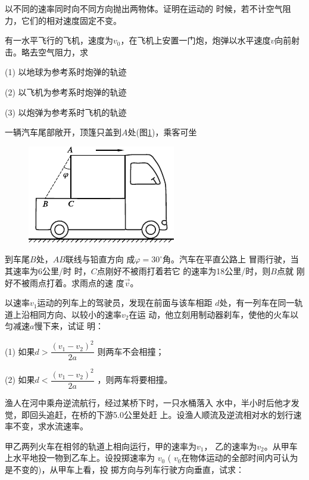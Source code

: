 \begin{exercises}

\exercise 以不同的速率同时向不同方向抛出两物体。证明在运动的
时候，若不计空气阻力，它们的相对速度固定不变。

\exercise 有一水平飞行的飞机，速度为$ v _ { 0 }$，在飞机上安置一门炮，炮弹以水平速度$ v $向前射击。略去空气阻力，求

(1) 以地球为参考系时炮弹的轨迹

(2) 以飞机为参考系时炮弹的轨迹

(3) 以炮弹为参考系时飞机的轨迹

\exercise 一辆汽车尾部敞开，顶篷只盖到$A$处(图\ref{fig:02.17})，乘客可坐
\begin{figure}
  \includegraphics{figure/fig02.17}
  \caption{}
  \label{fig:02.17}
\end{figure}
到车尾$B$处，$AB$联线与铅直方向
成$ \varphi = 3 0 ^ { \circ } $角。汽车在平直公路上
冒雨行驶，当其速率为6公里/时
时，$C$点刚好不被雨打着若它
的速率为18公里/时，则$B$点就
刚好不被雨点打着。求雨点的速
度$ \vec{v} $。

\exercise 以速率$ v _ { 1 } $运动的列车上的驾驶员，发现在前面与该车相距
$d$处，有一列车在同一轨道上沿相同方向、以较小的速率$v_2$在运
动，他立刻用制动器刹车，使他的火车以匀减速$a$慢下来，试证
明：

(1) 如果$d > \dfrac { \left( v _ { 1 } - v _ { 2 } \right) ^ { 2 } } { 2 a }$
则两车不会相撞；

(2) 如果$d < \dfrac { \left( v _ { 1 } - v _ { 2 } \right) ^ { 2 } } { 2 a }$
，则两车将要相撞。

\clearpage
\exercise 渔人在河中乘舟逆流航行，经过某桥下时，一只水桶落入
水中，半小时后他才发觉，即回头追赶，在桥的下游5.0公里处赶
上。设渔人顺流及逆流相对水的划行速率不变，求水流速率。

\exercise 甲乙两列火车在相邻的轨道上相向运行，甲的速率为$v_1$，
乙的速率为$v_2$。从甲车上水平地投一物到乙车上。设投掷速率为
$v _ { 0 }$ ( $v_0 $在物体运动的全部时间内可认为是不变的)，从甲车上看，投
掷方向与列车行驶方向垂直，试求：


\end{exercises}
